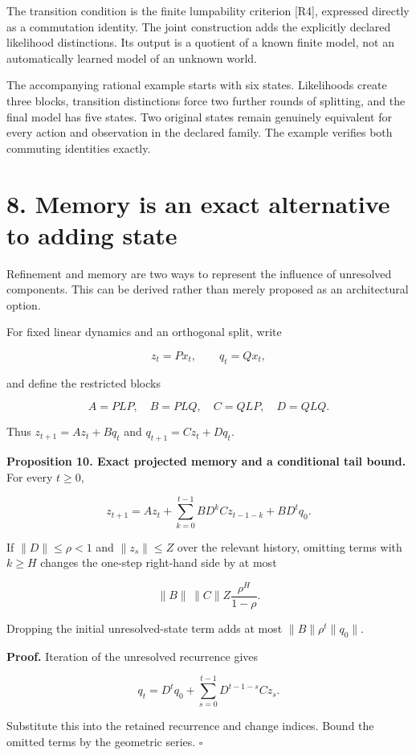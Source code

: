 \documentclass[11pt,letterpaper]{article}
\begin{document}
The transition condition is the finite lumpability criterion {[}R4{]},
expressed directly as a commutation identity. The joint construction
adds the explicitly declared likelihood distinctions. Its output is a
quotient of a known finite model, not an automatically learned model of
an unknown world.

The accompanying rational example starts with six states. Likelihoods
create three blocks, transition distinctions force two further rounds of
splitting, and the final model has five states. Two original states
remain genuinely equivalent for every action and observation in the
declared family. The example verifies both commuting identities exactly.

\section{8. Memory is an exact alternative to adding
state}\label{memory-is-an-exact-alternative-to-adding-state}

Refinement and memory are two ways to represent the influence of
unresolved components. This can be derived rather than merely proposed
as an architectural option.

For fixed linear dynamics and an orthogonal split, write

\[
z_t=Px_t,\qquad q_t=Qx_t,
\]

and define the restricted blocks

\[
A=PLP,\quad B=PLQ,\quad C=QLP,\quad D=QLQ.
\]

Thus \(z_{t+1}=Az_t+Bq_t\) and \(q_{t+1}=Cz_t+Dq_t\).

\textbf{Proposition 10. Exact projected memory and a conditional tail
bound.} For every \(t\geq0\),

\[
\boxed{
z_{t+1}=Az_t+
\sum_{k=0}^{t-1}BD^kCz_{t-1-k}+BD^tq_0.
}
\]

If \(\|D\|\leq\rho<1\) and \(\|z_s\|\leq Z\) over the relevant history,
omitting terms with \(k\geq H\) changes the one-step right-hand side by
at most

\[
\|B\|\,\|C\|Z\frac{\rho^H}{1-\rho}.
\]

Dropping the initial unresolved-state term adds at most
\(\|B\|\rho^t\|q_0\|\).

\textbf{Proof.} Iteration of the unresolved recurrence gives

\[
q_t=D^tq_0+\sum_{s=0}^{t-1}D^{t-1-s}Cz_s.
\]

Substitute this into the retained recurrence and change indices. Bound
the omitted terms by the geometric series. \(\square\)
\end{document}
